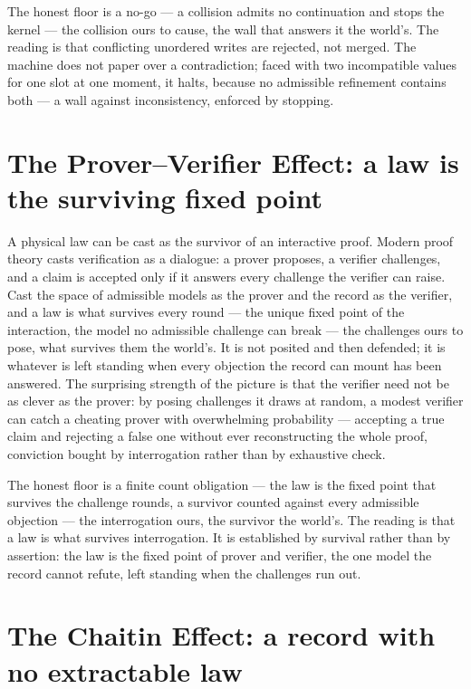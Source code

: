 The honest floor is a no-go --- a collision admits no continuation and stops the kernel --- the collision ours
to cause, the wall that answers it the world's. The reading is that
conflicting unordered writes are rejected, not merged. The machine does not paper over a contradiction; faced
with two incompatible values for one slot at one moment, it halts, because no admissible refinement contains
both --- a wall against inconsistency, enforced by stopping.

\section{The Prover--Verifier Effect: a law is the surviving fixed point}
\label{se:prover-verifier}

A physical law can be cast as the survivor of an interactive proof. Modern proof theory casts verification as a
dialogue: a prover proposes, a verifier challenges, and a claim is accepted only if it answers every challenge
the verifier can raise. Cast the space of admissible models as the prover and the record as the verifier, and a
law is what survives every round --- the unique fixed point of the interaction, the model no admissible
challenge can break --- the challenges ours to pose, what survives them the world's. It is not posited and then defended; it is whatever is left standing when every objection
the record can mount has been answered. The surprising strength of the picture is that the verifier need not be
as clever as the prover: by posing challenges it draws at random, a modest verifier can catch a cheating
prover with overwhelming probability --- accepting a true claim and rejecting a false one without ever
reconstructing the whole proof, conviction bought by interrogation rather than by exhaustive check.

The honest floor is a finite count obligation --- the law is the fixed point that survives the challenge
rounds, a survivor counted against every admissible objection --- the interrogation ours, the survivor the
world's. The reading is that a law is what survives
interrogation. It is established by survival rather than by assertion: the law is the fixed point of prover and
verifier, the one model the record cannot refute, left standing when the challenges run out.

\section{The Chaitin Effect: a record with no extractable law}
\label{se:chaitin}

